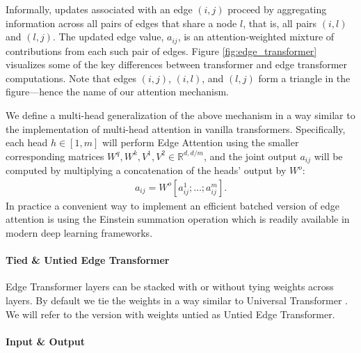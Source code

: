 \documentclass{article}
\begin{document}
Informally, updates associated with an edge $(i,j)$ proceed by
aggregating information across all pairs of edges that share a node
$l$, that is, all pairs $(i, l)$ and $(l,j)$. The updated edge value,
$a_{ij}$, is an attention-weighted mixture of contributions from each
such pair of edges.
Figure \ref{fig:edge_transformer} visualizes some of the key
differences between transformer and edge transformer computations.
Note that edges $(i,j)$, $(i,l)$, and $(l,j)$ form a triangle in the
figure---hence the name of our attention mechanism.

We define a multi-head generalization of the above mechanism in a way
similar to the implementation of multi-head attention in vanilla
transformers.  Specifically, each head $h \in [1, m]$ will perform
Edge Attention using the smaller corresponding matrices
$W^q, W^k, V^1, V^2 \in \mathbb{R}^{d,d / m}$, and the joint output
$a_{ij}$ will be computed by multiplying a concatenation of the heads'
output by $W^o$: \begin{align} a_{ij} = W^o \left[ a^{1}_{ij}; \ldots;
    a^{m}_{ij} \right].
\end{align}
In practice a convenient way to implement an efficient batched version
of edge attention is using the Einstein summation operation which is
readily available in modern deep learning frameworks. 

\paragraph{Tied \& Untied Edge Transformer}

Edge Transformer layers can be stacked with or without tying weights
across layers. By default we tie the weights in a way similar to 
Universal Transformer \citep{dehghani_universal_2019}. We will refer
to the version with weights untied as Untied Edge Transformer.

\paragraph{Input \& Output}
\end{document}
